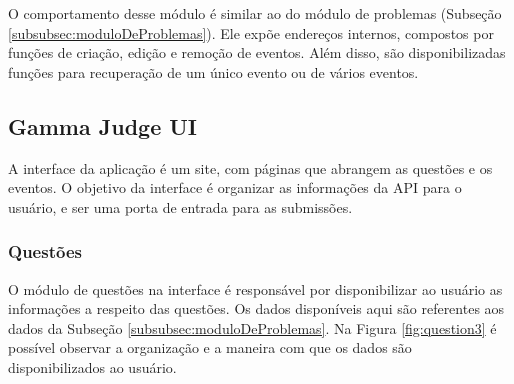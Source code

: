 O comportamento desse módulo é similar ao do módulo de problemas (Subseção \ref{subsubsec:moduloDeProblemas}). Ele expõe endereços internos, compostos por funções de criação, edição e remoção de eventos. Além disso, são disponibilizadas funções para recuperação de um único evento ou de vários eventos.

\subsection{Gamma Judge UI}
\label{sec:gamaJudgeUI}

A interface da aplicação é um site, com páginas que abrangem as questões e os eventos. O objetivo da interface é organizar as informações da API para o usuário, e ser uma porta de entrada para as submissões.




\subsubsection{Questões}

O módulo de questões na interface é responsável por disponibilizar ao usuário as informações a respeito das questões. Os dados disponíveis aqui são referentes aos dados da Subseção \ref{subsubsec:moduloDeProblemas}. Na Figura \ref{fig:question3} é possível observar a organização e a maneira com que os dados são disponibilizados ao usuário.


